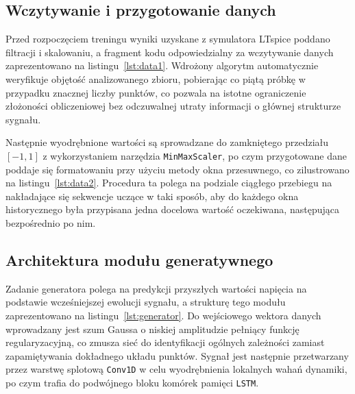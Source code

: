 
 
\subsection{Wczytywanie i przygotowanie danych}
 
Przed rozpoczęciem treningu wyniki uzyskane z symulatora LTspice poddano filtracji i skalowaniu, a fragment kodu odpowiedzialny za wczytywanie danych zaprezentowano na listingu~\ref{lst:data1}. Wdrożony algorytm automatycznie weryfikuje objętość analizowanego zbioru, pobierając co piątą próbkę w przypadku znacznej liczby punktów, co pozwala na istotne ograniczenie złożoności obliczeniowej bez odczuwalnej utraty informacji o głównej strukturze sygnału.
 

 
Następnie wyodrębnione wartości są sprowadzane do zamkniętego przedziału $[-1, 1]$ z wykorzystaniem narzędzia \texttt{MinMaxScaler}, po czym przygotowane dane poddaje się formatowaniu przy użyciu metody okna przesuwnego, co zilustrowano na listingu~\ref{lst:data2}. Procedura ta polega na podziale ciągłego przebiegu na nakładające się sekwencje uczące w taki sposób, aby do każdego okna historycznego była przypisana jedna docelowa wartość oczekiwana, następująca bezpośrednio po nim.
 

 
\subsection{Architektura modułu generatywnego}
 
Zadanie generatora polega na predykcji przyszłych wartości napięcia na podstawie wcześniejszej ewolucji sygnału, a strukturę tego modułu zaprezentowano na listingu~\ref{lst:generator}. Do wejściowego wektora danych wprowadzany jest szum Gaussa o niskiej amplitudzie pełniący funkcję regularyzacyjną, co zmusza sieć do identyfikacji ogólnych zależności zamiast zapamiętywania dokładnego układu punktów. Sygnał jest następnie przetwarzany przez warstwę splotową \texttt{Conv1D} w celu wyodrębnienia lokalnych wahań dynamiki, po czym trafia do podwójnego bloku komórek pamięci \texttt{LSTM}.
 
